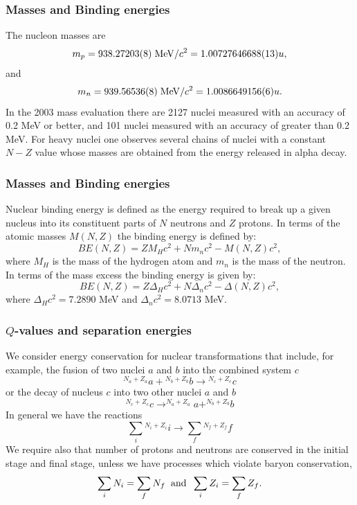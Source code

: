 \documentclass[compress]{beamer}
\begin{document}
\frame
{
  \frametitle{Masses and Binding energies}
\begin{small}
{\scriptsize
The nucleon masses are
\[
m_p = 938.27203(8)\hspace{0.1cm} \mathrm{MeV}/c^2 = 1.00727646688(13)u,
\]
and 
\[
m_n = 939.56536(8)\hspace{0.1cm} \mathrm{MeV}/c^2 = 1.0086649156(6)u.
\]
In the 2003 mass evaluation there are 2127 nuclei measured with an accuracy of 0.2
MeV or better, and 101 nuclei measured with an accuracy of greater than 0.2 MeV. For
heavy nuclei one observes several chains of nuclei with a constant $N-Z$ value whose masses
are obtained from the energy released in alpha decay.
}
\end{small}
}


\frame
{
  \frametitle{Masses and Binding energies}
\begin{small}
{\scriptsize
Nuclear binding energy is defined as the energy required to break up a given nucleus
into its constituent parts of $N$ neutrons and $Z$ protons. In terms of the atomic masses
$M(N, Z)$ the binding energy is defined by:
\[
BE(N, Z) = ZM_H c^2 + Nm_n c^2 - M(N, Z)c^2 ,
\]
where $M_H$ is the mass of the hydrogen atom and $m_n$ is the mass of the neutron.
In terms
of the mass excess the binding energy is given by:
\[
BE(N, Z) = Z\Delta_H c^2 + N\Delta_n c^2 -\Delta(N, Z)c^2 ,
\]
where $\Delta_H c^2 = 7.2890$ MeV and $\Delta_n c^2 = 8.0713$ MeV.

}
\end{small}
}


\frame
{
  \frametitle{$Q$-values and separation energies}
\begin{small}
{\scriptsize
We consider energy conservation for nuclear transformations that include, for
example, the fusion of two nuclei $a$ and $b$ into the combined system $c$
\[
{^{N_a+Z_a}}a+ {^{N_b+Z_b}}b\rightarrow {^{N_c+Z_c}}c
\]
or the decay of nucleus $c$ into two other nuclei $a$ and $b$
\[
^{N_c+Z_c}c \rightarrow  ^{N_a+Z_a}a+ ^{N_b+Z_b}b
\]
In general we have the reactions
\[
\sum_i {^{N_i+Z_i}}i \rightarrow  \sum_f {^{N_f+Z_f}}f
\]
We require also that number of protons and neutrons are conserved in the initial stage and final stage, unless we have processes which violate baryon conservation, 
\[
\sum_iN_i = \sum_f N_f \hspace{0.2cm}\mathrm{and} \hspace{0.2cm}\sum_iZ_i = \sum_f Z_f.
\]
}
\end{small}
}
\end{document}
